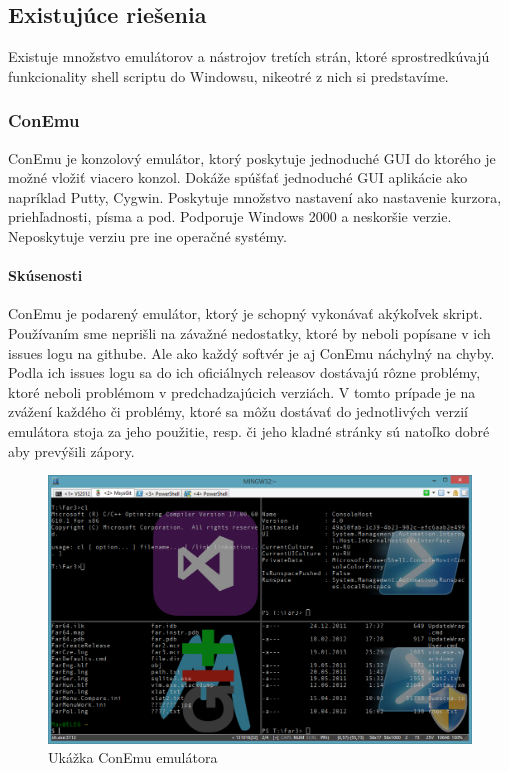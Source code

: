 \subsection{Existujúce riešenia}
\indent
Existuje množstvo emulátorov a nástrojov tretích strán, ktoré sprostredkúvajú funkcionality shell scriptu do Windowsu, nikeotré z nich si predstavíme.

\subsubsection{ConEmu}
\indent ConEmu je konzolový emulátor, ktorý poskytuje jednoduché GUI do ktorého je možné vložiť viacero konzol. Dokáže spúšťať jednoduché GUI aplikácie ako napríklad Putty, Cygwin. Poskytuje množstvo nastavení ako nastavenie kurzora, priehľadnosti, písma a pod. Podporuje Windows 2000 a neskoršie verzie. Neposkytuje verziu pre ine operačné systémy. \cite{conemu}
\paragraph{Skúsenosti}
\indent ConEmu je podarený emulátor, ktorý je schopný vykonávať akýkoľvek skript. Používaním sme neprišli na závažné nedostatky, ktoré by neboli popísane v ich issues logu na githube. Ale ako každý softvér je aj ConEmu náchylný na chyby. Podla ich issues logu sa do ich oficiálnych releasov dostávajú rôzne problémy, ktoré neboli problémom v predchadzajúcich verziách. V tomto prípade je na zvážení každého či problémy, ktoré sa môžu dostávať do jednotlivých verzií emulátora stoja za jeho použitie, resp. či jeho kladné stránky sú natoľko dobré aby prevýšili zápory.

\begin{figure}[!htbp]
\centering
\includegraphics[scale=0.3]{img/conEmuImg.jpg}
\caption{Ukážka ConEmu emulátora}
\label{fig:test}
\end{figure}
\newpage

